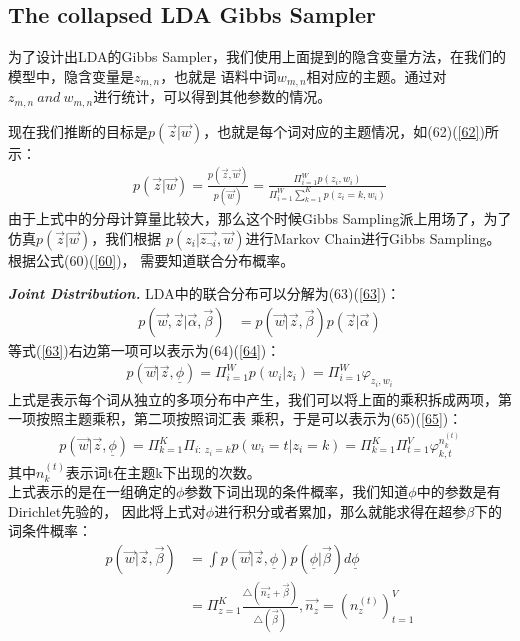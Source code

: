 \documentclass[UTF8]{ctexart}
\begin{document}
\subsection{The collapsed LDA Gibbs Sampler}
为了设计出LDA的Gibbs Sampler，我们使用上面提到的隐含变量方法，在我们的模型中，隐含变量是$z_{m,n}$，也就是
语料中词$w_{m,n}$相对应的主题。通过对$z_{m,n}\ and \ w_{m,n}$进行统计，可以得到其他参数的情况。
\par
现在我们推断的目标是$p(\vec{z}|\vec{w})$，也就是每个词对应的主题情况，如(62)(\ref{62})所示：
\begin{align}
\label{62}
p(\vec{z}|\vec{w}) = \frac{p(\vec{z},\vec{w})}{p(\vec{w})} 
= \frac{\Pi_{i=1}^W p(z_i, w_i)}{\Pi_{i=1}^W\sum_{k=1}^Kp(z_i=k,w_i)}
\end{align}
由于上式中的分母计算量比较大，那么这个时候Gibbs Sampling派上用场了，为了仿真$p(\vec{z}|\vec{w})$，我们根据
$p(z_i|\vec{z_{\neg i}}, \vec{w})$进行Markov Chain进行Gibbs Sampling。根据公式(60)(\ref{60})，
需要知道联合分布概率。
\par
\emph{\textbf{Joint Distribution.}} LDA中的联合分布可以分解为(63)(\ref{63})：
\begin{align}
\label{63}
p(\vec{w}, \vec{z} | \vec{\alpha}, \vec{\beta}) &=
p(\vec{w}|\vec{z},\vec{\beta}) p(\vec{z}|\vec{\alpha})
\end{align}
等式(\ref{63})右边第一项可以表示为(64)(\ref{64})：
\begin{align}
\label{64}
p(\vec{w} | \vec{z}, \underline{\phi}) = \Pi_{i=1}^W p(w_i|z_i) 
= \Pi_{i=1}^W \varphi_{z_i, w_i}
\end{align}
上式是表示每个词从独立的多项分布中产生，我们可以将上面的乘积拆成两项，第一项按照主题乘积，第二项按照词汇表
乘积，于是可以表示为(65)(\ref{65})：
\begin{align}
\label{65}
p(\vec{w} | \vec{z}, \underline{\phi}) = 
\Pi_{k=1}^K \Pi_{i:\ z_i=k} p(w_i=t|z_i=k) =
\Pi_{k=1}^K \Pi_{t=1}^V \varphi_{k,t}^{n_k^{(t)}}
\end{align}
其中$n_k^{(t)}$表示词t在主题k下出现的次数。\\
上式表示的是在一组确定的$\phi$参数下词出现的条件概率，我们知道$\phi$中的参数是有Dirichlet先验的，
因此将上式对$\phi$进行积分或者累加，那么就能求得在超参$\beta$下的词条件概率：
\begin{align}
p(\vec{w}|\vec{z}, \vec{\beta}) &= \int 
p(\vec{w}|\vec{z}, \underline{\phi}) p(\underline{\phi}|\vec{\beta}) d\underline{\phi}
\\
&= \Pi_{z=1}^K \frac{\triangle(\vec{n_z}+\vec{\beta})}{\triangle(\vec{\beta})},
\vec{n_z}=\left( n_z^{(t)} \right)_{t=1}^V
\end{align}
\end{document}
